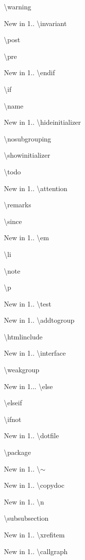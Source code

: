 \begin{DoxyDescription}
\item[]\textbackslash{}warning 
\item[New in 1.\+1.\+0]\textbackslash{}invariant 
\item[]\textbackslash{}post 
\item[]\textbackslash{}pre 
\item[New in 1.\+1.\+3]\textbackslash{}endif 
\item[]\textbackslash{}if 
\item[]\textbackslash{}name 
\item[New in 1.\+1.\+4]\textbackslash{}hideinitializer 
\item[]\textbackslash{}nosubgrouping 
\item[]\textbackslash{}showinitializer 
\item[]\textbackslash{}todo 
\item[New in 1.\+1.\+5]\textbackslash{}attention 
\item[]\textbackslash{}remarks 
\item[]\textbackslash{}since 
\item[New in 1.\+2.\+0]\textbackslash{}em 
\item[]\textbackslash{}li 
\item[]\textbackslash{}note 
\item[]\textbackslash{}p 
\item[New in 1.\+2.\+1]\textbackslash{}test 
\item[New in 1.\+2.\+7]\textbackslash{}addtogroup 
\item[]\textbackslash{}htmlinclude 
\item[New in 1.\+2.\+8]\textbackslash{}interface 
\item[]\textbackslash{}weakgroup 
\item[New in 1.\+2.\+9.\+1]\textbackslash{}else 
\item[]\textbackslash{}elseif 
\item[]\textbackslash{}ifnot 
\item[New in 1.\+2.\+10]\textbackslash{}dotfile 
\item[]\textbackslash{}package 
\item[New in 1.\+2.\+14]\textbackslash{}$\sim$ 
\item[New in 1.\+2.\+17]\textbackslash{}copydoc 
\item[New in 1.\+2.\+18]\textbackslash{}n 
\item[]\textbackslash{}subsubsection 
\item[New in 1.\+3.\+1]\textbackslash{}xrefitem 
\item[New in 1.\+3.\+2]\textbackslash{}callgraph 

\end{DoxyDescription}
